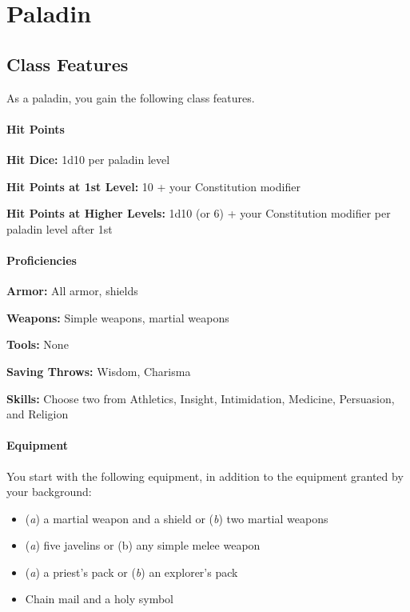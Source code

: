 \documentclass[
]{article}
\date{}
\providecommand{\tightlist}{%
  \setlength{\itemsep}{0pt}\setlength{\parskip}{0pt}}
\begin{document}
\hypertarget{paladin}{%
\section{Paladin}\label{paladin}}

\hypertarget{class-features}{%
\subsection{Class Features}\label{class-features}}

As a paladin, you gain the following class features.

\hypertarget{hit-points}{%
\paragraph{Hit Points}\label{hit-points}}

\textbf{Hit Dice:} 1d10 per paladin level

\textbf{Hit Points at 1st Level:} 10 + your Constitution modifier

\textbf{Hit Points at Higher Levels:} 1d10 (or 6) + your Constitution
modifier per paladin level after 1st

\hypertarget{proficiencies}{%
\paragraph{Proficiencies}\label{proficiencies}}

\textbf{Armor:} All armor, shields

\textbf{Weapons:} Simple weapons, martial weapons

\textbf{Tools:} None

\textbf{Saving Throws:} Wisdom, Charisma

\textbf{Skills:} Choose two from Athletics, Insight, Intimidation,
Medicine, Persuasion, and Religion

\hypertarget{equipment}{%
\paragraph{Equipment}\label{equipment}}

You start with the following equipment, in addition to the equipment
granted by your background:

\begin{itemize}
\tightlist
\item
  (\emph{a}) a martial weapon and a shield or (\emph{b}) two martial
  weapons
\item
  (\emph{a}) five javelins or (b) any simple melee weapon
\item
  (\emph{a}) a priest's pack or (\emph{b}) an explorer's pack
\item
  Chain mail and a holy symbol
\end{itemize}
\end{document}
